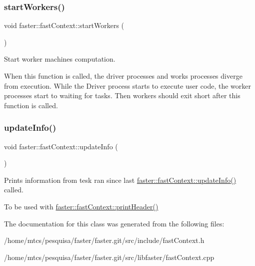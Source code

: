 \subsubsection{\texorpdfstring{start\+Workers()}{startWorkers()}}
{\footnotesize\ttfamily void faster\+::fast\+Context\+::start\+Workers (\begin{DoxyParamCaption}{ }\end{DoxyParamCaption})}



Start worker machines computation. 

When this function is called, the driver processes and works processes diverge from execution. While the Driver process starts to execute user code, the worker processes start to waiting for tasks. Then workers should exit short after this function is called. \hypertarget{classfaster_1_1fastContext_ae6e69c86414bc5333da72aef13257d26}{}\label{classfaster_1_1fastContext_ae6e69c86414bc5333da72aef13257d26} 
\subsubsection{\texorpdfstring{update\+Info()}{updateInfo()}}
{\footnotesize\ttfamily void faster\+::fast\+Context\+::update\+Info (\begin{DoxyParamCaption}{ }\end{DoxyParamCaption})}



Prints information from tesk ran since last \hyperlink{classfaster_1_1fastContext_ae6e69c86414bc5333da72aef13257d26}{faster\+::fast\+Context\+::update\+Info()} called. 

To be used with \hyperlink{classfaster_1_1fastContext_a721a0db53e603bff27578e040b616f6f}{faster\+::fast\+Context\+::print\+Header()} 

The documentation for this class was generated from the following files\+:\begin{DoxyCompactItemize}
\item 
/home/mtcs/pesquisa/faster/faster.\+git/src/include/fast\+Context.\+h\item 
/home/mtcs/pesquisa/faster/faster.\+git/src/libfaster/fast\+Context.\+cpp\end{DoxyCompactItemize}
